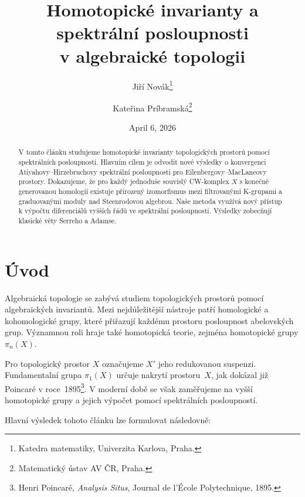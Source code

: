 \documentclass[12pt,a4paper]{article}
\title{Homotopick\'{e} invarianty a spektr\'{a}ln\'{i} posloupnosti\\v algebraick\'{e} topologii}
\author{%
  Ji\v{r}\'{i} Nov\'{a}k\thanks{Katedra matematiky, Univerzita Karlova, Praha.}
  \and
  Kate\v{r}ina Pr\'{i}bramsk\'{a}\thanks{Matematick\'{y} \'{u}stav AV \v{C}R, Praha.}
}
\date{April 6, 2026}
\theoremstyle{plain}
\theoremstyle{definition}
\theoremstyle{remark}
\begin{document}
\maketitle

\begin{abstract}
V tomto \v{c}l\'{a}nku studujeme homotopick\'{e} invarianty topologick\'{y}ch prostor\r{u}
pomoc\'{i} spektr\'{a}ln\'{i}ch posloupnost\'{i}. Hlavn\'{i}m c\'{i}lem je odvodit nov\'{e}
v\'{y}sledky o konvergenci Atiyahovy--Hirzebruchovy spektr\'{a}ln\'{i} posloupnosti
pro Eilenbergovy--MacLaneovy prostory. Dokazujeme, \v{z}e pro ka\v{z}d\'{y}
jednodu\v{s}e souvisl\'{y} CW-komplex $X$ s kone\v{c}n\v{e} generovanou homologi\'{i}
existuje p\v{r}irozen\'{y} izomorfismus mezi filtrovan\'{y}mi K-grupami a
graduovan\'{y}mi moduly nad Steenrodovou algebrou. Na\v{s}e metoda vyu\v{z}\'{i}v\'{a}
nov\'{y} p\v{r}\'{i}stup k v\'{y}po\v{c}tu diferenci\'{a}l\r{u} vy\v{s}\v{s}\'{i}ch \v{r}\'{a}d\r{u}
ve spektr\'{a}ln\'{i} posloupnosti. V\'{y}sledky zobec\v{n}uj\'{i} klasick\'{e} v\v{e}ty
Serreho a Adamse.
\end{abstract}

\tableofcontents

\section{\'{U}vod}
\label{sec:uvod}

Algebraick\'{a} topologie se zab\'{y}v\'{a} studiem topologick\'{y}ch prostor\r{u}
pomoc\'{i} algebraick\'{y}ch invariant\r{u}. Mezi nejd\r{u}le\v{z}it\v{e}j\v{s}\'{i} n\'{a}stroje
pat\v{r}\'{i} homologick\'{e} a kohomologick\'{e} grupy, kter\'{e} p\v{r}i\v{r}azuj\'{i}
ka\v{z}d\'{e}mu prostoru posloupnost abelovsk\'{y}ch grup. V\'{y}znamnou roli hraje
tak\'{e} homotopick\'{a} teorie, zejm\'{e}na homotopick\'{e} grupy $\pi_n(X)$.

Pro topologick\'{y} prostor $X$ ozna\v{c}ujeme $X′$ jeho redukovanou suspenzi.
Fundamentaln\'{i} grupa $\pi_1(X)$ ur\v{c}uje nakryt\'{i} prostoru~$X$, jak dok\'{a}zal
ji\v{z} Poincar\'{e} v roce~1895\footnote{Henri Poincar\'{e}, \emph{Analysis Situs},
Journal de l'\'{E}cole Polytechnique, 1895.}. V modern\'{i} dob\v{e} se v\v{s}ak
zam\v{e}\v{r}ujeme na vy\v{s}\v{s}\'{i} homotopick\'{e} grupy a jejich v\'{y}po\v{c}et
pomoc\'{i} spektr\'{a}ln\'{i}ch posloupnost\'{i}.

Hlavn\'{i} v\'{y}sledek tohoto \v{c}l\'{a}nku lze formulovat n\'{a}sledovn\v{e}:
\end{document}
